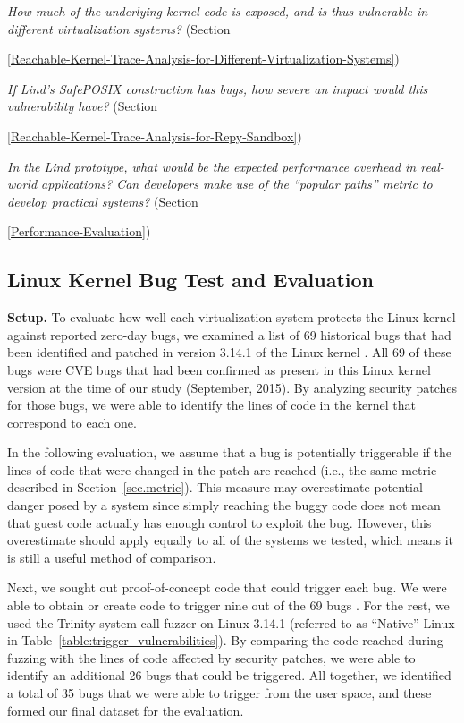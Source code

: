 \textit{How much of the underlying kernel code is exposed, and is thus
vulnerable in different virtualization systems?}
(Section~{{\ref{Reachable-Kernel-Trace-Analysis-for-Different-Virtualization-Systems}})

\textit{If Lind's SafePOSIX construction has bugs, how severe an impact would
this vulnerability have?}
(Section~{{\ref{Reachable-Kernel-Trace-Analysis-for-Repy-Sandbox}})

\textit{In the Lind prototype, what would be the expected performance overhead in
real-world applications? Can developers make use of the ``popular paths'' metric to develop 
practical systems?}
(Section~{{\ref{Performance-Evaluation}})

\subsection{Linux Kernel Bug Test and Evaluation}
\label{Linux-Kernel-Bug-Test-and-Evaluation}


\noindent
\textbf{Setup.}
To evaluate how well each virtualization system protects the Linux kernel
against reported zero-day bugs,
we examined a list of 69 historical bugs that had been identified and patched in version 3.14.1 of the Linux kernel \cite{CVE-Datasource}. 
All 69 of these bugs were CVE \cite{CVE} bugs that had been confirmed as present in this Linux kernel version at the time of our study (September, 2015). 
By analyzing security patches for those bugs,
we were able to identify the lines of code in the kernel that correspond to each one.

In the following evaluation, we assume that a bug is potentially triggerable if the lines of code that were changed in the patch are reached
(i.e., the same metric described in Section~\ref{sec.metric}).
This measure may overestimate potential danger posed by a system since simply reaching the buggy code does not mean that guest code
actually has enough control to exploit the bug.
However, this overestimate should apply equally to all of the systems we tested, which means it is still a useful method of comparison.

Next, we sought out proof-of-concept code that could trigger each bug.
We were able to obtain or create code to trigger nine out of the 69 bugs \cite{Exploit-Database}.
For the rest, we used the Trinity system call fuzzer
\cite{Trinity} on Linux 3.14.1 (referred to as ``Native'' Linux in Table~\ref{table:trigger_vulnerabilities}).
By comparing the code reached during fuzzing with the lines of code affected by security patches,
we were able to identify an additional 26 bugs that could be triggered. 
All together, we identified a total of 35 bugs that we were able to trigger from the user space, and these formed our final dataset for the evaluation. 

}}}
